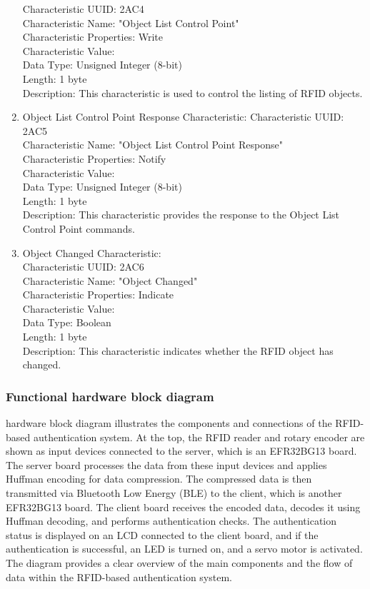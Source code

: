 \documentclass[a4paper,11pt]{article}%
\begin{document}
\begin{enumerate}
    Characteristic UUID: 2AC4\\
    Characteristic Name: "Object List Control Point"\\
    Characteristic Properties: Write\\
    Characteristic Value:\\
    Data Type: Unsigned Integer (8-bit)\\
    Length: 1 byte\\
    Description: This characteristic is used to control the listing of RFID objects.
    \item Object List Control Point Response Characteristic:
    Characteristic UUID: 2AC5\\
    Characteristic Name: "Object List Control Point Response"\\
    Characteristic Properties: Notify\\
    Characteristic Value:\\
    Data Type: Unsigned Integer (8-bit)\\
    Length: 1 byte\\
    Description: This characteristic provides the response to the Object List Control Point commands.\\
    \item Object Changed Characteristic:\\
    Characteristic UUID: 2AC6\\
    Characteristic Name: "Object Changed"\\
    Characteristic Properties: Indicate\\
    Characteristic Value:\\
    Data Type: Boolean\\
    Length: 1 byte\\
    Description: This characteristic indicates whether the RFID object has changed.\\
\end{enumerate}


\pagebreak
\subsubsection{Functional hardware block diagram}

hardware block diagram illustrates the components and connections of the RFID-based authentication system. At the top, the RFID reader and rotary encoder are shown as input devices connected to the server, which is an EFR32BG13 board. The server board processes the data from these input devices and applies Huffman encoding for data compression. The compressed data is then transmitted via Bluetooth Low Energy (BLE) to the client, which is another EFR32BG13 board. The client board receives the encoded data, decodes it using Huffman decoding, and performs authentication checks. The authentication status is displayed on an LCD connected to the client board, and if the authentication is successful, an LED is turned on, and a servo motor is activated. The diagram provides a clear overview of the main components and the flow of data within the RFID-based authentication system.
\end{document}
